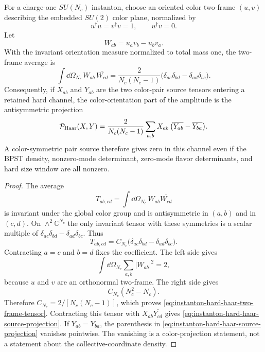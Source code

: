 \begin{proposition}
\label{prop:instanton-hard-haar-orientation-tensor}
For a charge-one \(SU(N_c)\) instanton, choose an oriented color two-frame
\((u,v)\) describing the embedded \(SU(2)\) color plane, normalized by
\[
  u^\dagger u=v^\dagger v=1,\qquad u^\dagger v=0 .
\]
Let
\[
  W_{ab}=u_av_b-u_bv_a .
\]
With the invariant orientation measure normalized to total mass one, the
two-frame average is
\begin{equation}
  \int \dd\Omega_{N_c}\,
  W_{ab}\,\overline{W_{cd}}
  =
  \frac{2}{N_c(N_c-1)}
  \bigl(
    \delta_{ac}\delta_{bd}
    -
    \delta_{ad}\delta_{bc}
  \bigr).
  \label{eq:instanton-hard-haar-two-frame-tensor}
\end{equation}
Consequently, if \(X_{ab}\) and \(Y_{ab}\) are the two color-pair source
tensors entering a retained hard channel, the color-orientation part of the
amplitude is the antisymmetric projection
\begin{equation}
  \mathcal P_{\rm Haar}(X,Y)
  =
  \frac{2}{N_c(N_c-1)}
  \sum_{a,b}
  X_{ab}\,
  \bigl(\overline{Y_{ab}}-\overline{Y_{ba}}\bigr).
  \label{eq:instanton-hard-haar-source-projection}
\end{equation}
A color-symmetric pair source therefore gives zero in this channel even if
the BPST density, nonzero-mode determinant, zero-mode flavor determinants,
and hard size window are all nonzero.
\end{proposition}

\begin{proof}
The average
\[
  T_{ab,cd}
  =
  \int \dd\Omega_{N_c}\,W_{ab}\overline{W_{cd}}
\]
is invariant under the global color group and is antisymmetric in
\((a,b)\) and in \((c,d)\).  On
\(\wedge^2\mathbb C^{N_c}\) the only invariant tensor with these symmetries
is a scalar multiple of
\(\delta_{ac}\delta_{bd}-\delta_{ad}\delta_{bc}\).  Thus
\[
  T_{ab,cd}
  =
  C_{N_c}
  \bigl(
    \delta_{ac}\delta_{bd}
    -
    \delta_{ad}\delta_{bc}
  \bigr).
\]
Contracting \(a=c\) and \(b=d\) fixes the coefficient.  The left side gives
\[
  \int\dd\Omega_{N_c}\sum_{a,b}|W_{ab}|^2
  =
  2,
\]
because \(u\) and \(v\) are an orthonormal two-frame.  The right side gives
\[
  C_{N_c}(N_c^2-N_c).
\]
Therefore \(C_{N_c}=2/[N_c(N_c-1)]\), which proves
\eqref{eq:instanton-hard-haar-two-frame-tensor}.  Contracting this tensor
with \(X_{ab}\overline{Y_{cd}}\) gives
\eqref{eq:instanton-hard-haar-source-projection}.  If \(Y_{ab}=Y_{ba}\),
the parenthesis in \eqref{eq:instanton-hard-haar-source-projection} vanishes
pointwise.  The vanishing is a color-projection statement, not a statement
about the collective-coordinate density.
\end{proof}

